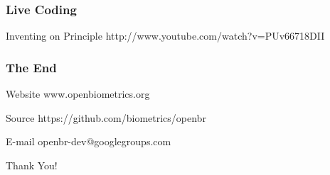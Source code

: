 \documentclass[12pt]{beamer}
\begin{document}
\begin{frame}
\frametitle{Live Coding}
\begin{block}{Inventing on Principle}
http://www.youtube.com/watch?v=PUv66718DII
\end{block}
\end{frame}

\begin{frame}
\frametitle{The End}
\begin{block}{Website}
\centering
www.openbiometrics.org
\end{block}
\begin{block}{Source}
\centering
https://github.com/biometrics/openbr
\end{block}
\begin{block}{E-mail}
\centering
openbr-dev@googlegroups.com
\end{block}
\begin{center}
Thank You!
\end{center}
\end{frame}


\end{document}
